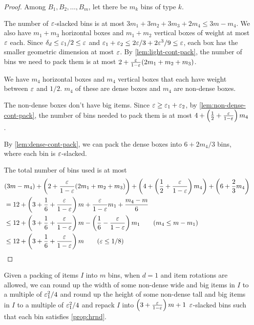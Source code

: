 \begin{proof}
Among $B_1, B_2, \ldots, B_m$, let there be $m_k$ bins of type $k$.

The number of $\varepsilon$-slacked bins is at most
$3m_1 + 3m_2 + 3m_3 + 2m_4 \le 3m - m_4$.
We also have $m_1 + m_3$ horizontal boxes and $m_1 + m_2$ vertical boxes
of weight at most $\varepsilon$ each. Since $\delta_d \le \varepsilon_1/2 \le \varepsilon$
and $\varepsilon_1 + \varepsilon_2 \le 2\varepsilon/3 + 2\varepsilon^3/9 \le \varepsilon$, each box has the smaller
geometric dimension at most $\varepsilon$.
By \cref{lem:light-cont-pack}, the number of bins we need to pack them is at most
$2 + \frac{\varepsilon}{1-\varepsilon}(2m_1 + m_2 + m_3)$.

We have $m_4$ horizontal boxes and $m_4$ vertical boxes
that each have weight between $\varepsilon$ and $1/2$.
$m_4$ of these are dense boxes and $m_4$ are non-dense boxes.

The non-dense boxes don't have big items. Since $\varepsilon \ge \varepsilon_1 + \varepsilon_2$,
by \cref{lem:non-dense-cont-pack}, the number of bins needed to pack them is at most
$4 + \left(\frac{1}{2} + \frac{\varepsilon}{1-\varepsilon}\right)m_4$.

By \cref{lem:dense-cont-pack}, we can pack the dense boxes into
$6 + 2m_4/3$ bins, where each bin is $\varepsilon$-slacked.

The total number of bins used is at most
\begin{align*}
& (3m - m_4) + \left(2 + \frac{\eps}{1-\eps}(2m_1 + m_2 + m_3)\right)
 + \left(4 + \left(\frac{1}{2} + \frac{\eps}{1-\eps}\right)m_4\right)
+ \left(6 + \frac{2}{3}m_4\right)
\\ &= 12 + \left(3 + \frac{1}{6} + \frac{\eps}{1-\eps}\right)m
    + \frac{\eps}{1-\eps}m_1 + \frac{m_4-m}{6}
\\ &\le 12 + \left(3 + \frac{1}{6} + \frac{\eps}{1-\eps}\right)m
    - \left(\frac{1}{6} - \frac{\eps}{1-\eps}\right)m_1
\tag{$m_4 \le m - m_1$}
\\ &\le 12 + \left(3 + \frac{1}{6} + \frac{\eps}{1-\eps} \right)m
\tag{$\eps \le 1/8$}
\end{align*}
\end{proof}

\begin{lemma}
\label{lem:ws-1-pack-rot}
Given a packing of items $I$ into $m$ bins, when $d=1$ and item rotations are allowed, we can
round up the width of some non-dense wide and big items in $I$ to a multiple of $\varepsilon_1^2/4$
and round up the height of some non-dense tall and big items in $I$ to a multiple of $\varepsilon_1^2/4$
and repack $I$ into $\left(3 + \frac{\varepsilon}{1-\varepsilon}\right)m + 1$
$\varepsilon$-slacked bins such that each bin satisfies \cref{prop:hrnd}.
\end{lemma}


